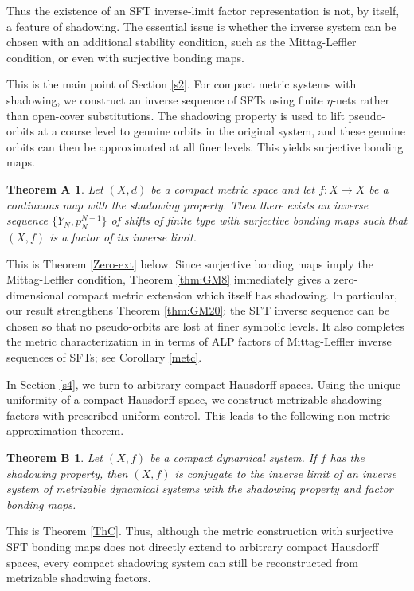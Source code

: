 \documentclass[12pt]{amsart}
\theoremstyle{definition}
\numberwithin{equation}{section}
\newtheorem*{theoremA}{Theorem A}
\newtheorem*{theoremB}{Theorem B}
\theoremstyle{remark}
\begin{document}
Thus the existence of an SFT inverse-limit factor representation is not, by
itself, a feature of shadowing. The essential issue is whether the inverse system
can be chosen with an additional stability condition, such as the
Mittag-Leffler condition, or even with surjective bonding maps.

This is the main point of Section \ref{s2}. For compact metric systems with
shadowing, we construct an inverse sequence of SFTs using finite $\eta$-nets
rather than open-cover substitutions. The shadowing property is used to lift
pseudo-orbits at a coarse level to genuine orbits in the original system, and
these genuine orbits can then be approximated at all finer levels. This yields
surjective bonding maps.

\begin{theoremA}
\emph{Let $(X,d)$ be a compact metric space and let $f:X\to X$ be a continuous map
with the shadowing property. Then there exists an inverse sequence
$\{Y_N,p_N^{N+1}\}$ of shifts of finite type with surjective bonding maps such
that $(X,f)$ is a factor of its inverse limit.}
\end{theoremA}

This is Theorem \ref{Zero-ext} below. Since surjective bonding maps imply the
Mittag-Leffler condition, Theorem \ref{thm:GM8} immediately gives a
zero-dimensional compact metric extension which itself has shadowing. In
particular, our result strengthens Theorem \ref{thm:GM20}: the SFT inverse
sequence can be chosen so that no pseudo-orbits are lost at finer symbolic
levels. It also completes the metric characterization in \cite[Corollary 28]{GM}
in terms of ALP factors of Mittag-Leffler inverse sequences of SFTs; see
Corollary \ref{metc}.

In Section \ref{s4}, we turn to arbitrary compact Hausdorff spaces.
Using the unique uniformity of a compact Hausdorff space, we construct metrizable
shadowing factors with prescribed uniform control. This leads to the following
non-metric approximation theorem.

\begin{theoremB}
\emph{Let $(X,f)$ be a compact dynamical system. If $f$ has the shadowing property,
then $(X,f)$ is conjugate to the inverse limit of an inverse system of
metrizable dynamical systems with the shadowing property and factor bonding
maps.}
\end{theoremB}

This is Theorem \ref{ThC}. Thus, although the metric construction with
surjective SFT bonding maps does not directly extend to arbitrary compact
Hausdorff spaces, every compact shadowing system can still be reconstructed from
metrizable shadowing factors.
\end{document}
